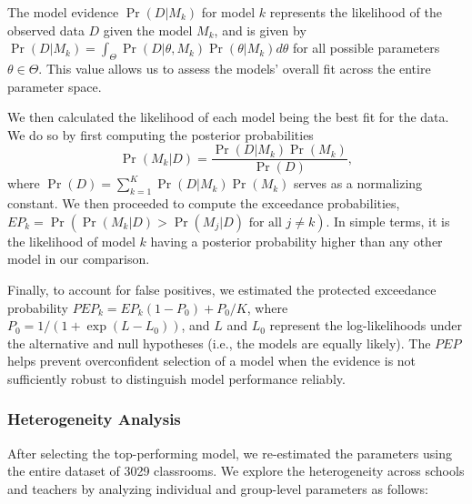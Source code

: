 \documentclass[
  number,
  preprint,
  3p,
  onecolumn]{elsarticle}
\begin{document}
The model evidence \(\Pr(D | M_k)\) for model \(k\) represents the
likelihood of the observed data \(D\) given the model \(M_k\), and is
given by
\(\Pr(D|M_k) = \int_{\Theta} \Pr(D|\theta, M_k) \Pr(\theta|M_k) d\theta\)
for all possible parameters \(\theta \in \Theta\). This value allows us
to assess the models' overall fit across the entire parameter space.

We then calculated the likelihood of each model being the best fit for
the data. We do so by first computing the posterior probabilities \[
\Pr(M_k|D) = \frac{\Pr(D|M_k)\Pr(M_k)}{\Pr(D)},
\] where \(\Pr(D) = \sum_{k=1}^K \Pr(D|M_k)\Pr(M_k)\) serves as a
normalizing constant. We then proceeded to compute the exceedance
probabilities,
\(EP_k = \Pr(\Pr(M_k|D) > \Pr(M_j|D) \text{ for all } j \neq k)\). In
simple terms, it is the likelihood of model \(k\) having a posterior
probability higher than any other model in our comparison.

Finally, to account for false positives, we estimated the protected
exceedance probability \(PEP_k = EP_k(1 - P_0) + P_0/K\), where
\(P_0 = 1/(1 + \exp(L - L_0))\), and \(L\) and \(L_0\) represent the
log-likelihoods under the alternative and null hypotheses (i.e., the
models are equally likely). The \(PEP\) helps prevent overconfident
selection of a model when the evidence is not sufficiently robust to
distinguish model performance reliably.

\subsubsection{Heterogeneity Analysis}\label{heterogeneity-analysis}

After selecting the top-performing model, we re-estimated the parameters
using the entire dataset of 3029 classrooms. We explore the
heterogeneity across schools and teachers by analyzing individual and
group-level parameters as follows:
\end{document}
